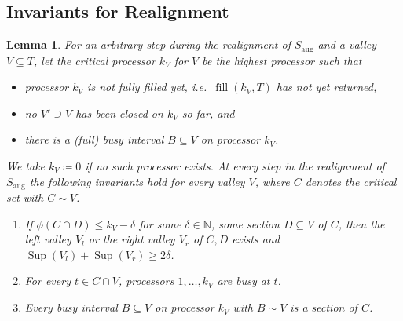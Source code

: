 \documentclass[a4paper]{article}
\DeclareMathOperator{\aug}{aug}
\DeclareMathOperator{\fillop}{fill}
\DeclareMathOperator{\res}{Sup}
\newtheorem{lemma}[theorem]{Lemma}
\begin{document}
\subsection{Invariants for Realignment}
\begin{lemma}\label{lemma:invariant}
  For an arbitrary step during the realignment of $S_{\aug}$ and a valley $V \subseteq T$, let the \emph{critical processor $k_V$ for $V$} be the highest processor such that
  \begin{itemize}
    \item
      processor $k_V$ is not fully filled yet, i.e.\ $\fillop(k_V, T)$ has not yet returned,
    \item
      no $V' \supseteq V$ has been closed on $k_V$ so far, and
    \item
      there is a (full) busy interval $B \subseteq V$ on processor $k_V$.
  \end{itemize}
  We take $k_V \coloneqq 0$ if no such processor exists.
  At every step in the realignment of $S_{\aug}$ the following invariants hold for every valley $V$, where $C$ denotes the critical set with $C \sim V$.
  \begin{enumerate}
    \item
      If $\phi(C \cap D) \leq k_V - \delta$ for some $\delta \in \mathbb{N}$, some section $D \subseteq V$ of $C$, then the left valley $V_l$ or the right valley $V_r$ of $C, D$ exists and $\res(V_l) + \res(V_r) \geq 2 \delta$.
    \item
      For every $t \in C \cap V$, processors $1, \ldots, k_V$ are busy at $t$.
    \item
      Every busy interval $B \subseteq V$ on processor $k_V$ with $B \sim V$ is a section of $C$.
  \end{enumerate}
\end{lemma}
\end{document}
